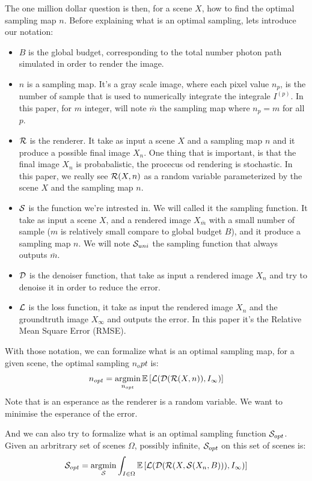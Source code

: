 \documentclass{classeENS}
\begin{document}
\par The one million dollar question is then, for a scene $X$, how to find the optimal
sampling map $n$. Before explaining what is an optimal sampling, lets introduce our notation:
\begin{itemize}
    \item $B$ is the global budget, corresponding to the total number photon path simulated
    in order to render the image.
    \item $n$ is a sampling map. It's a gray scale image, where each pixel value $n_p$, is the
    number of sample that is used to numerically integrate the integrale $I^{(p)}$. In this paper,
    for $m$ integer, will note $\bar m$ the sampling map where $n_p = m$ for all $p$.
    \item $\mathcal R$ is the renderer. It take as input a scene $X$ and a sampling map $n$ and it produce
    a possible final image $X_n$. One thing that is important, is that the final image $X_n$ is
    probabalistic, the procecus od rendering is stochastic. In this paper, we really see $\mathcal R(X,n)$ 
    as a random variable parameterized by the scene $X$ and the sampling map $n$.
    \item $\mathcal S$ is the function we're intrested in. We will called it the sampling function. 
    It take as input a scene $X$, and a rendered image $X_{\bar m}$ with a small number 
    of sample ($m$ is relatively small compare to global budget $B$), and it produce a sampling map $n$.
    We will note $\mathcal S_{uni}$ the sampling function that always outputs $\bar m$.
    \item $\mathcal D$ is the denoiser function, that take as input a rendered image $X_n$ and try to
    denoise it in order to reduce the error.
    \item $\mathcal L$ is the loss function, it take as input the rendered image $X_n$ and the groundtruth 
    image $X_\infty$ and outputs the error. In this paper it's the Relative Mean Square Error (RMSE).
\end{itemize}
With those notation, we can formalize what is an optimal sampling map, for a given scene, 
the optimal sampling $n_opt$ is:
\begin{equation}
    \label{eq:0}
    n_{opt} = \operatorname*{argmin}_{n_{opt}} \mathbb E \left [ \mathcal L (\mathcal D (\mathcal R(X, n)), I_\infty) \right ]
\end{equation}
Note that is an esperance as the renderer is a random variable. We want to minimise the 
esperance of the error.

\par And we can also try to formalize what is an optimal sampling function $\mathcal S_{opt}$.
Given an arbritrary set of scenes $\Omega$, possibly infinite, $\mathcal S_{opt}$ on this set of 
scenes is:
\begin{equation}
    \label{eq:1}
    \mathcal S_{opt} = \operatorname*{argmin}_{\mathcal S} \int_{I\in\Omega} \mathbb E \left [ \mathcal L (\mathcal D (\mathcal R(X, \mathcal S(X_n, B))), I_\infty) \right ]
\end{equation}
\end{document}

